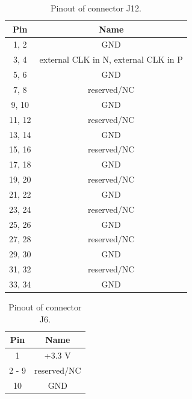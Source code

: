 	\begin{table}
	\begin{small}
		\begin{center}
			\begin{tabular}{|c|c|}
				\hline
				Pin & Name\\
				\hline\hline
				1, 2 & GND\\
				\hline
				3, 4 & external CLK in N, external CLK in P\\
				\hline
				5, 6 & GND\\
				\hline
				7, 8 & reserved/NC\\
				\hline
				9, 10 & GND\\
				\hline
				11, 12 & reserved/NC\\
				\hline
				13, 14 & GND\\
				\hline
				15, 16 & reserved/NC\\
				\hline
				17, 18 & GND\\
				\hline
				19, 20 & reserved/NC\\
				\hline
				21, 22 & GND\\
				\hline
				23, 24 & reserved/NC\\
				\hline
				25, 26 & GND\\
				\hline
				27, 28 & reserved/NC\\
				\hline
				29, 30 & GND\\
				\hline
				31, 32 & reserved/NC\\
				\hline
				33, 34 & GND\\
				\hline
			\end{tabular}
			\caption{Pinout of connector J12.}
			\label{J12}
		\end{center}
	\end{small}
	\end{table}

	\begin{table}
	\begin{small}
		\begin{center}
			\begin{tabular}{|c|c|}
				\hline
				Pin & Name\\
				\hline\hline
				1 & +3.3 V\\
				\hline
				2 - 9 & reserved/NC\\
				\hline
				10 & GND\\
				\hline
			\end{tabular}
			\caption{Pinout of connector J6.}
			\label{J6}
		\end{center}
	\end{small}
	\end{table}





	


